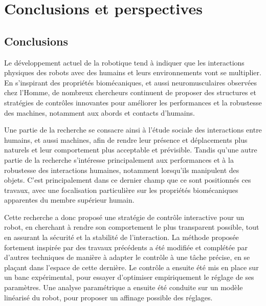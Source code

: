 \chapter*{Conclusions et perspectives}\label{chap6}

\section{Conclusions}

Le développement actuel de la robotique tend à indiquer que les interactions physiques des robots avec des humains et leurs environnements vont se multiplier. En s'inspirant des propriétés biomécaniques, et aussi neuromusculaires observées chez l'Homme, de nombreux chercheurs continuent de proposer des structures et stratégies de contrôles innovantes pour améliorer les performances et la robustesse des machines, notamment aux abords et contacts d'humains. 

Une partie de la recherche se consacre ainsi à l'étude sociale des interactions entre humains, et aussi machines, afin de rendre leur présence et déplacements plus naturels et leur comportement plus acceptable et prévisible. Tandis qu'une autre partie de la recherche s'intéresse principalement aux performances et à la robustesse des interactions humaines, notamment lorsqu'ils manipulent des objets. C'est principalement dans ce dernier champ que ce sont positionnés ces travaux, avec une focalisation particulière sur les propriétés biomécaniques apparentes du membre supérieur humain.

Cette recherche a donc proposé une stratégie de contrôle interactive pour un robot, en cherchant à rendre son comportement le plus transparent possible, tout en assurant la sécurité et la stabilité de l'interaction. La méthode proposée fortement inspirée par des travaux précédents a été modifiée et complétée par d'autres techniques de manière à adapter le contrôle à une tâche précise, en se plaçant dans l'espace de cette dernière. Le contrôle a ensuite été mis en place sur un banc expérimental, pour essayer d'optimiser empiriquement le réglage de ses paramètres. %
Une analyse paramétrique a ensuite été conduite sur un modèle linéarisé du robot, pour proposer un affinage possible des réglages.

